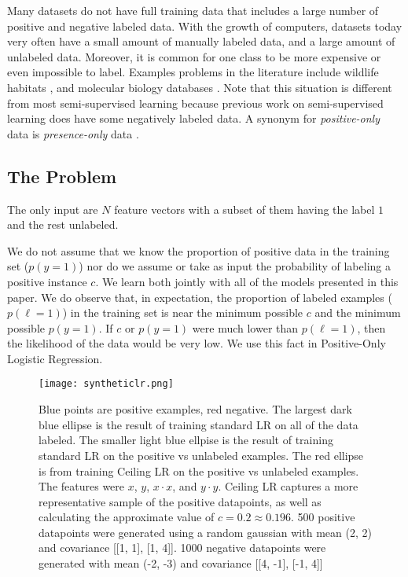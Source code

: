\documentclass{article}
\begin{document}
Many datasets do not have full training data that includes a large number of positive and negative labeled data.  With the growth of computers, datasets today very often have a small amount of manually labeled data, and a large amount of unlabeled data. Moreover, it is common for one class to be more expensive or even impossible to label.  Examples problems in the literature include wildlife habitats \cite{ward08}, and molecular biology databases \cite{elkan08}.  Note that this situation is different from most semi-supervised learning because previous work on semi-supervised learning does have some negatively labeled data.  A synonym for \emph{positive-only} data is \emph{presence-only} data \cite{ward08}.

\subsection{The Problem}

The only input are $N$ feature vectors with a subset of them having the label $1$ and the rest unlabeled.  

We do not assume that we know the proportion of positive data in the training set ($p(y=1)$) nor do we assume or take as input the probability of labeling a positive instance $c$.  We learn both jointly with all of the models presented in this paper.  We do observe that, in expectation, the proportion of labeled examples ($p(\ell=1)$) in the training set is near the minimum possible $c$ and the minimum possible $p(y=1)$. If $c$ or $p(y=1)$ were much lower than $p(\ell=1)$, then the likelihood of the data would be very low.  We use this fact in Positive-Only Logistic Regression.

\begin{figure*}[ht!]
\vskip 0.2in
\begin{center}
\centerline{\texttt{[image: syntheticlr.png]}}
\caption{Blue points are positive examples, red negative. The largest dark blue ellipse is the result of training standard LR on all of the data labeled. The smaller light blue ellpise is the result of training standard LR on the positive vs unlabeled examples. The red ellipse is from training Ceiling LR on the positive vs unlabeled examples. The features were $x$, $y$, $x \cdot x$, and $y \cdot y$.  Ceiling LR captures a more representative sample of the positive datapoints, as well as calculating the approximate value of $c = 0.2 \approx 0.196$.   500 positive datapoints were generated using a random gaussian with mean (2, 2) and covariance [[1, 1], [1, 4]].  1000 negative datapoints were generated with mean (-2, -3) and covariance [[4, -1], [-1, 4]]}
\label{synthetic}
\end{center}
\vskip -0.2in
\end{figure*}
\end{document}

